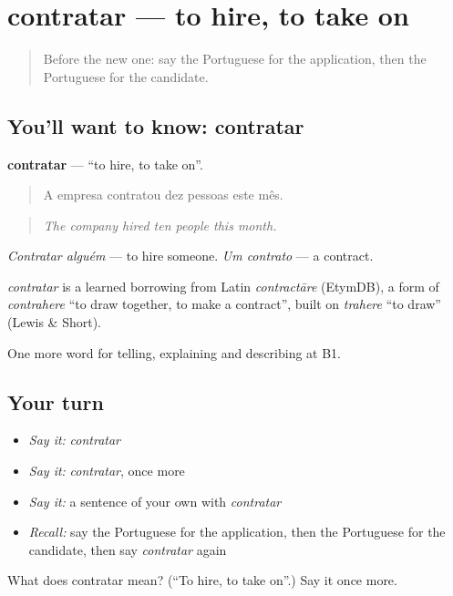 \section[contratar]{contratar — to hire, to take on}

\label{lesson:PT-C355-contratar}



\begin{quote}
Before the new one: say the Portuguese for the application, then the Portuguese for the candidate.
\end{quote}

\subsection*{You'll want to know: contratar}
\textbf{contratar} — \textquotedblleft{}to hire, to take on\textquotedblright{}.

\begin{quote}
A empresa contratou dez pessoas este mês.
\end{quote}

\begin{quote}
\emph{The company hired ten people this month.}
\end{quote}

\emph{Contratar alguém} — to hire someone. \emph{Um contrato} — a contract.

\begin{cousinweb}
\emph{contratar} is a learned borrowing from Latin \emph{contractāre} (EtymDB), a form of \emph{contrahere} \textquotedblleft{}to draw together, to make a contract\textquotedblright{}, built on \emph{trahere} \textquotedblleft{}to draw\textquotedblright{} (Lewis \& Short).
\end{cousinweb}

\begin{grammarlens}[title={What you've built}]
One more word for telling, explaining and describing at B1.
\end{grammarlens}

\subsection*{Your turn}
\begin{itemize}
\raggedright
  \item \emph{Say it:} \emph{contratar}
  \item \emph{Say it:} \emph{contratar}, once more
  \item \emph{Say it:} a sentence of your own with \emph{contratar}
  \item \emph{Recall:} say the Portuguese for the application, then the Portuguese for the candidate, then say \emph{contratar} again
\end{itemize}

\begin{tcolorbox}[breakable,colback=teal!4,colframe=teal!35!black,title={Before you move on}]
What does contratar mean? (\textquotedblleft{}To hire, to take on\textquotedblright{}.) Say it once more.
\end{tcolorbox}
